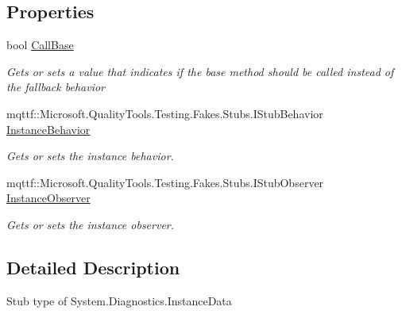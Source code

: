 \subsection*{Properties}
\begin{DoxyCompactItemize}
\item 
bool \hyperlink{class_system_1_1_diagnostics_1_1_fakes_1_1_stub_instance_data_ac67053f3b79e989d250ea251b4e7074a}{Call\-Base}
\begin{DoxyCompactList}\small\item\em Gets or sets a value that indicates if the base method should be called instead of the fallback behavior\end{DoxyCompactList}\item 
mqttf\-::\-Microsoft.\-Quality\-Tools.\-Testing.\-Fakes.\-Stubs.\-I\-Stub\-Behavior \hyperlink{class_system_1_1_diagnostics_1_1_fakes_1_1_stub_instance_data_af56e2b529759f7fb41d051e1ecff4430}{Instance\-Behavior}
\begin{DoxyCompactList}\small\item\em Gets or sets the instance behavior.\end{DoxyCompactList}\item 
mqttf\-::\-Microsoft.\-Quality\-Tools.\-Testing.\-Fakes.\-Stubs.\-I\-Stub\-Observer \hyperlink{class_system_1_1_diagnostics_1_1_fakes_1_1_stub_instance_data_a1e3b80a5aa140df6761ba192e81b0fbe}{Instance\-Observer}
\begin{DoxyCompactList}\small\item\em Gets or sets the instance observer.\end{DoxyCompactList}\end{DoxyCompactItemize}


\subsection{Detailed Description}
Stub type of System.\-Diagnostics.\-Instance\-Data



